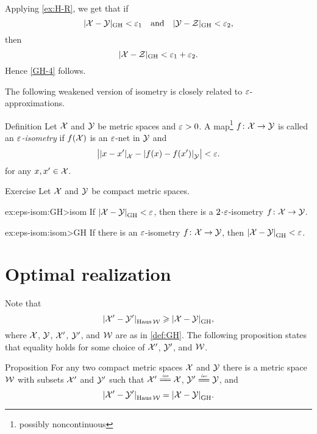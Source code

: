 Applying \ref{ex:H-R}, we get that if 
\[|\mathcal{X}-\mathcal{Y}|_{\operatorname{\rm GH}\nolimits}<\varepsilon_1
\quad\text{and}\quad
|\mathcal{Y}-\mathcal{Z}|_{\operatorname{\rm GH}\nolimits}<\varepsilon_2,
\]
then 
\[|\mathcal{X}-\mathcal{Z}|_{\operatorname{\rm GH}\nolimits}<\varepsilon_1+\varepsilon_2.\]
Hence \ref{GH-4} follows.
\qeds

The following weakened version of isometry is closely related to $\varepsilon$-approximations.

\begin{thm}{Definition} Let $\mathcal{X}$ and $\mathcal{Y}$ be metric spaces and $\varepsilon>0$. 
A  map\footnote{possibly noncontinuous} $f\: \spc{X} \z\to \spc{Y}$ is called an \emph{$\varepsilon$-isometry} 
if $f(\mathcal{X})$ is an $\varepsilon$-net in $\mathcal{Y}$ and
\[\bigl|\dist{x}{x'}{\spc{X}}-\dist{f(x)}{f(x')}{\spc{Y}}\bigr|<\eps.\]
for any $x,x'\in \mathcal{X}$.
\end{thm}

\begin{thm}{Exercise}\label{ex:eps-isom}
Let $\mathcal{X}$ and $\mathcal{Y}$ be compact metric spaces.

\begin{subthm}{ex:eps-isom:GH>isom}
If $\dist{\spc{X}}{\spc{Y}}{\GH}<\eps$, then there is a $2\cdot\eps$-isometry $f\colon\mathcal{X}\to\mathcal{Y}$.
\end{subthm}

\begin{subthm}{ex:eps-isom:isom>GH}
If there is an $\varepsilon$-isometry $f\colon\mathcal{X}\to\mathcal{Y}$, then $\dist{\spc{X}}{\spc{Y}}{\GH}<\eps$.
\end{subthm}

\end{thm}

\section{Optimal realization}\label{sec:extfun=GH}

Note that
\[\dist{\spc{X}'}{\spc{Y}'}{\Haus\spc{W}}\ge \dist{\spc{X}}{\spc{Y}}{\GH},\]
where $\mathcal{X}$, $\mathcal{Y}$, $\mathcal{X}'$, $\mathcal{Y}'$, and $\mathcal{W}$ are as in \ref{def:GH}.
The following proposition states that equality holds for some choice of $\mathcal{X}'$, $\mathcal{Y}'$, and $\mathcal{W}$.

\begin{thm}{Proposition}\label{prop:GH=H}
For any two compact metric spaces $\mathcal{X}$ and $\mathcal{Y}$ there is a metric space $\mathcal{W}$
with subsets $\mathcal{X}'$ and $\mathcal{Y}'$ such that 
$\spc{X}'\iso\spc{X}$, $\spc{Y}'\iso\spc{Y}$, and 
\[\dist{\spc{X}'}{\spc{Y}'}{\Haus\spc{W}}=\dist{\spc{X}}{\spc{Y}}{\GH}.\]
\end{thm}

